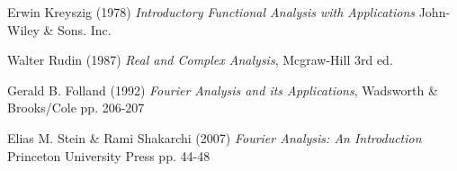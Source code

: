 \documentclass[a4paper]{article}
\begin{document}
\newpage

\begin{thebibliography}{999}
Erwin Kreyszig (1978) \emph{Introductory Functional Analysis with Applications} John-Wiley \& Sons. Inc.  

Walter Rudin (1987) \emph{Real and Complex Analysis}, Mcgraw-Hill 3rd ed.

Gerald B. Folland (1992) \emph{Fourier Analysis and its Applications}, Wadsworth \& Brooks/Cole pp. 206-207

Elias M. Stein \& Rami Shakarchi (2007) \emph{Fourier Analysis: An Introduction} Princeton University Press pp. 44-48

\end{thebibliography}
\end{document}
